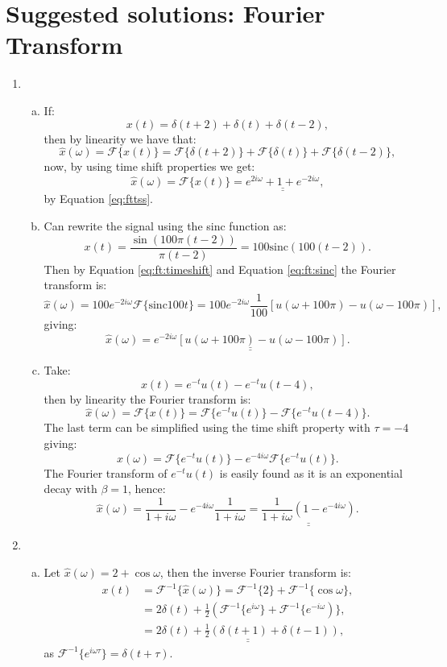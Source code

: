 \newpage
\section{Suggested solutions: Fourier Transform}
\begin{enumerate}

\item
\begin{enumerate}[a)]
\item If:
$$x(t)=\delta(t+2)+\delta(t)+\delta(t-2),$$
then by linearity we have that:
$$\hat{x}(\omega)=\mathcal{F}\{x(t)\}=\mathcal{F}\{\delta(t+2)\}+\mathcal{F}\{\delta(t)\}+\mathcal{F}\{\delta(t-2)\},$$
now, by using time shift properties we get:
$$\hat{x}(\omega)=\mathcal{F}\{x(t)\}=\underline{\underline{e^{2i\omega}+1+e^{-2i\omega}}},$$
by Equation \ref{eq:fttss}.

\item Can rewrite the signal using the sinc function as:
$$x(t)=\frac{\sin(100\pi(t-2))}{\pi(t-2)}=100\text{sinc}(100(t-2)).$$
Then by Equation \ref{eq:ft:timeshift} and Equation \ref{eq:ft:sinc} the Fourier transform is:
$$\hat{x}(\omega)=100e^{-2i\omega}\mathcal{F}\{\text{sinc}100t\}=100e^{-2i\omega} \frac{1}{100}[u(\omega+100\pi)-u(\omega-100\pi)],$$
giving:
$$\hat{x}(\omega)=\underline{\underline{e^{-2i\omega}[u(\omega+100\pi)-u(\omega-100\pi)]}}.$$

\item Take:
$$x(t)=e^{-t}u(t)-e^{-t}u(t-4),$$
then by linearity the Fourier transform is:
$$\hat{x}(\omega)=\mathcal{F}\{x(t)\}=\mathcal{F}\{e^{-t}u(t)\}-\mathcal{F}\{e^{-t}u(t-4)\}.$$
The last term can be simplified using the time shift property with $\tau=-4$ giving:
$$\hat{x}(\omega)=\mathcal{F}\{e^{-t}u(t)\}-e^{-4i\omega}\mathcal{F}\{e^{-t}u(t)\}.$$
The Fourier transform of $e^{-t}u(t)$ is easily found as it is an exponential decay with $\beta=1$, hence:
$$\hat{x}(\omega)=\frac{1}{1+i\omega}-e^{-4i\omega}\frac{1}{1+i\omega}=\underline{\underline{\frac{1}{1+i\omega}\left(1-e^{-4i\omega}\right)}}.$$
\end{enumerate}

\item
\begin{enumerate}[a)]
\item Let $\hat{x}(\omega)=2+\cos\omega$, then the inverse Fourier transform is:
\begin{align*}
    x(t)&=\mathcal{F}^{-1}\{\hat{x}(\omega)\}=\mathcal{F}^{-1}\{2\}+\mathcal{F}^{-1}\{\cos\omega\}, \\
    &=2\delta(t)+\frac{1}{2}(\mathcal{F}^{-1}\{e^{i\omega}\}+\mathcal{F}^{-1}\{e^{-i\omega})\}, \\ 
    &=\underline{\underline{2\delta(t)+\frac{1}{2}(\delta(t+1)+\delta(t-1))}},
\end{align*}
as $\mathcal{F}^{-1}\{e^{i\omega\tau}\}=\delta(t+\tau)$.


\end{enumerate}
\end{enumerate}
